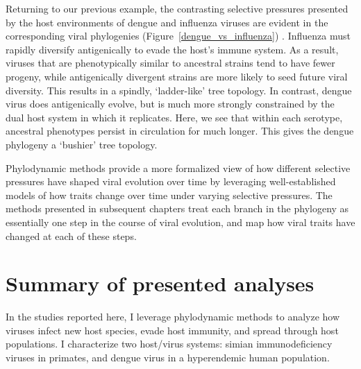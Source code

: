 Returning to our previous example, the contrasting selective pressures presented by the host environments of dengue and influenza viruses are evident in the corresponding viral phylogenies (Figure~\ref{dengue_vs_influenza}) \citep{volz2013viral,bedford2011strength}.
Influenza must rapidly diversify antigenically to evade the host's immune system.
As a result, viruses that are phenotypically similar to ancestral strains tend to have fewer progeny, while antigenically divergent strains are more likely to seed future viral diversity.
This results in a spindly, `ladder-like' tree topology.
In contrast, dengue virus does antigenically evolve, but is much more strongly constrained by the dual host system in which it replicates.
Here, we see that within each serotype, ancestral phenotypes persist in circulation for much longer.
This gives the dengue phylogeny a `bushier' tree topology.

Phylodynamic methods provide a more formalized view of how different selective pressures have shaped viral evolution over time by leveraging well-established models of how traits change over time under varying selective pressures.
The methods presented in subsequent chapters treat each branch in the phylogeny as essentially one step in the course of viral evolution, and map how viral traits have changed at each of these steps.

\section{Summary of presented analyses}
In the studies reported here, I leverage phylodynamic methods to analyze how viruses infect new host species, evade host immunity, and spread through host populations.
I characterize two host/virus systems: simian immunodeficiency viruses in primates, and dengue virus in a hyperendemic human population.

